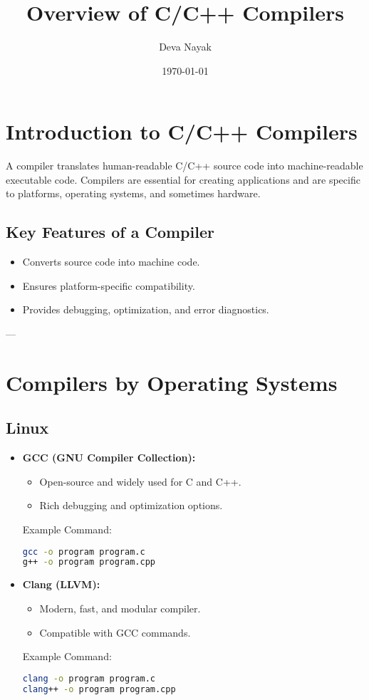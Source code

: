 \documentclass[a4paper,12pt]{article}
\title{Overview of C/C++ Compilers}
\author{Deva Nayak}
\date{\today}
\begin{document}
\maketitle

\section{Introduction to C/C++ Compilers}
A compiler translates human-readable C/C++ source code into machine-readable executable code. Compilers are essential for creating applications and are specific to platforms, operating systems, and sometimes hardware.

\subsection{Key Features of a Compiler}
\begin{itemize}
	\item Converts source code into machine code.
	\item Ensures platform-specific compatibility.
	\item Provides debugging, optimization, and error diagnostics.
\end{itemize}

---

\section{Compilers by Operating Systems}

\subsection{Linux}
\begin{itemize}
\item \textbf{GCC (GNU Compiler Collection):}
\begin{itemize}
	\item Open-source and widely used for C and C++.
	\item Rich debugging and optimization options.
\end{itemize}
Example Command:
\begin{lstlisting}[language=bash]
gcc -o program program.c
g++ -o program program.cpp
\end{lstlisting}

\item \textbf{Clang (LLVM):}
\begin{itemize}
	\item Modern, fast, and modular compiler.
	\item Compatible with GCC commands.
\end{itemize}
Example Command:
\begin{lstlisting}[language=bash]
clang -o program program.c
clang++ -o program program.cpp
\end{lstlisting}
\end{itemize}
\end{document}

